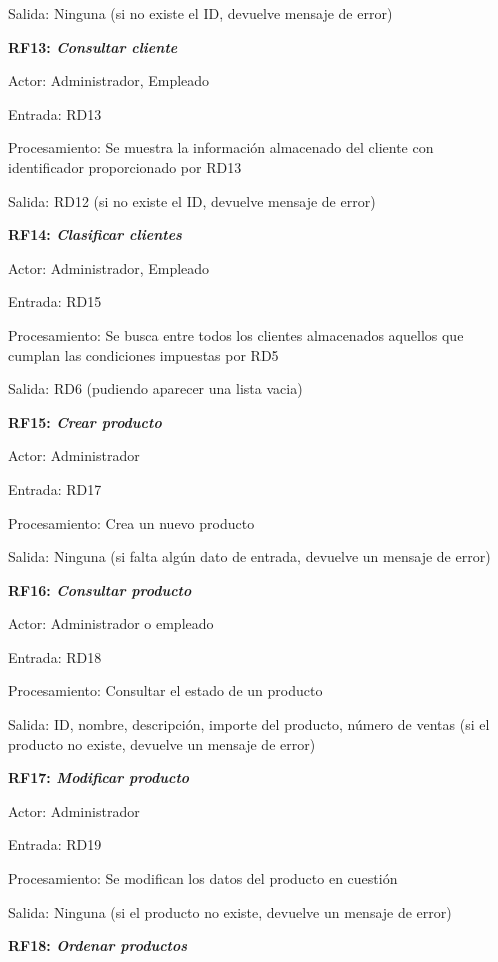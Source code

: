 \documentclass[paper=a4, fontsize=11pt, spanish]{scrartcl}
\begin{document}
Salida: Ninguna (si no existe el ID, devuelve mensaje de error)

\setlength{\parindent}{0em}
\textbf{RF13: \textit{Consultar cliente}}
\setlength{\parindent}{2em}

Actor: Administrador, Empleado

Entrada: RD13

Procesamiento: Se muestra la información almacenado del cliente con identificador proporcionado por RD13

Salida:  RD12 (si no existe el ID, devuelve mensaje de error)

\setlength{\parindent}{0em}
\textbf{RF14: \textit{Clasificar clientes}}
\setlength{\parindent}{2em}

Actor: Administrador, Empleado

Entrada: RD15

Procesamiento:  Se busca entre todos los clientes almacenados aquellos que cumplan las condiciones impuestas por RD5

Salida: RD6 (pudiendo aparecer una lista vacia)

\setlength{\parindent}{0em}
\textbf{RF15: \textit{Crear producto}}
\setlength{\parindent}{2em}

Actor: Administrador

Entrada: RD17

Procesamiento: Crea un nuevo producto

Salida: Ninguna (si falta algún dato de entrada, devuelve un mensaje de error)

\setlength{\parindent}{0em}
\textbf{RF16: \textit{Consultar producto}}
\setlength{\parindent}{2em}

Actor: Administrador o empleado

Entrada: RD18

Procesamiento: Consultar el estado de un producto

Salida: ID, nombre, descripción, importe del producto, número de ventas (si el producto no existe, devuelve un mensaje de error)

\setlength{\parindent}{0em}
\textbf{RF17: \textit{Modificar producto}}
\setlength{\parindent}{2em}

Actor: Administrador

Entrada: RD19

Procesamiento: Se modifican los datos del producto en cuestión

Salida: Ninguna (si el producto no existe, devuelve un mensaje de error)

\setlength{\parindent}{0em}
\textbf{RF18: \textit{Ordenar productos}}
\setlength{\parindent}{2em}
\end{document}
